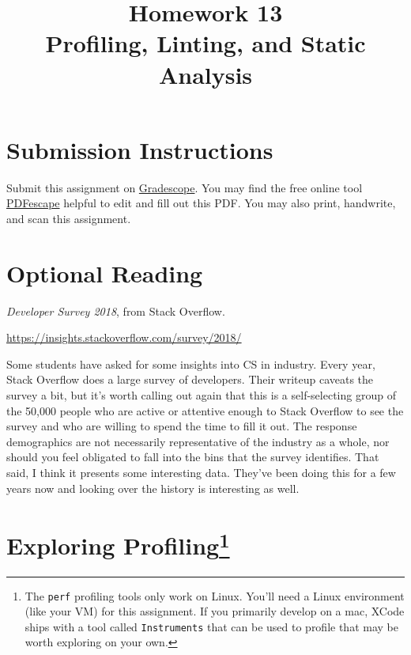 \documentclass{article}
\begin{document}
\fancyhead[L]{}
\fancyhead[R]{}

\fancyfoot[C]{\color{gray} \thepage~/~\pageref*{LastPage}}
\pagestyle{fancyplain}

\title{\textbf{Homework 13\\Profiling, Linting, and Static Analysis}}
\author{\textbf{\color{red}{Due: Wednesday, December 12th, 11:59PM (Hard Deadline)}}}
\date{}
\maketitle


\section*{Submission Instructions}
Submit this assignment on \href{https://gradescope.com/courses/24368}{Gradescope}.
You may find the free online tool \href{https://www.pdfescape.com}{PDFescape}
helpful to edit and fill out this PDF.
You may also print, handwrite, and scan this assignment.


\section*{Optional Reading}

\emph{Developer Survey 2018}, from Stack Overflow.

\url{https://insights.stackoverflow.com/survey/2018/}

Some students have asked for some insights into CS in industry. Every year,
Stack Overflow does a large survey of developers. Their writeup caveats the
survey a bit, but it's worth calling out again that this is a self-selecting
group of the 50,000 people who are active or attentive enough to Stack
Overflow to see the survey and who are willing to spend the time to fill it
out. The response demographics are not necessarily representative of the
industry as a whole, nor should you feel obligated to fall into the bins that
the survey identifies. That said, I think it presents some interesting data.
They've been doing this for a few years now and looking over the history is
interesting as well.


\newpage


\section{Exploring Profiling\protect\footnote{%
  The \texttt{perf} profiling tools only work on Linux. You'll need a Linux
  environment (like your VM) for this assignment. If you primarily develop on
  a mac, XCode ships with a tool called \texttt{Instruments} that can be used
  to profile that may be worth exploring on your own.
}}
\end{document}
